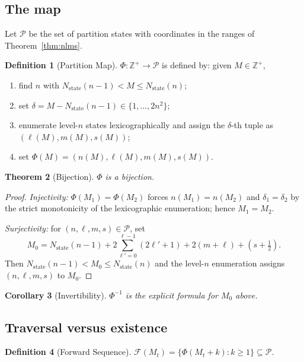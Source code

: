 \documentclass[twocolumn,10pt,a4paper]{article}
\theoremstyle{thmstyle}
\newtheorem{theorem}{Theorem}[section]
\newtheorem{corollary}[theorem]{Corollary}
\theoremstyle{definition}
\newtheorem{definition}[theorem]{Definition}
\theoremstyle{remark}
\newcommand{\Zp}{\mathbb{Z}^{+}}
\newcommand{\Parts}{\mathcal{P}}
\newcommand{\PhiMap}{\varPhi}
\newcommand{\calF}{\mathcal{F}}
\begin{document}
\subsection{The map}

Let $\Parts$ be the set of partition states with coordinates in the
ranges of Theorem~\ref{thm:nlms}.

\begin{definition}[Partition Map]
\label{def:phi}
$\PhiMap:\Zp\to\Parts$ is defined by: given $M\in\Zp$,
\begin{enumerate}[nosep,leftmargin=*]
\item find $n$ with $N_{\mathrm{state}}(n-1)<M\leq N_{\mathrm{state}}(n)$;
\item set $\delta=M-N_{\mathrm{state}}(n-1)\in\{1,\ldots,2n^{2}\}$;
\item enumerate level-$n$ states lexicographically and assign the
$\delta$-th tuple as $(\ell(M),m(M),s(M))$;
\item set $\PhiMap(M)=(n(M),\ell(M),m(M),s(M))$.
\end{enumerate}
\end{definition}

\begin{theorem}[Bijection]
\label{thm:bij}
$\PhiMap$ is a bijection.
\end{theorem}

\begin{proof}
\emph{Injectivity:} $\PhiMap(M_{1})=\PhiMap(M_{2})$ forces
$n(M_{1})=n(M_{2})$ and $\delta_{1}=\delta_{2}$ by the strict
monotonicity of the lexicographic enumeration; hence $M_{1}=M_{2}$.

\emph{Surjectivity:} for $(n,\ell,m,s)\in\Parts$, set
\[
M_{0}=N_{\mathrm{state}}(n-1)+2\sum_{\ell'=0}^{\ell-1}(2\ell'+1)
+2(m+\ell)+(s+\tfrac{1}{2}).
\]
Then $N_{\mathrm{state}}(n-1)<M_{0}\leq N_{\mathrm{state}}(n)$ and the
level-$n$ enumeration assigns $(n,\ell,m,s)$ to $M_{0}$.
\end{proof}

\begin{corollary}[Invertibility]
\label{cor:inv}
$\PhiMap^{-1}$ is the explicit formula for $M_{0}$ above.
\end{corollary}

\subsection{Traversal versus existence}

\begin{definition}[Forward Sequence]
\label{def:forward}
$\calF(M_{t})=\{\PhiMap(M_{t}+k):k\geq 1\}\subseteq\Parts$.
\end{definition}
\end{document}
